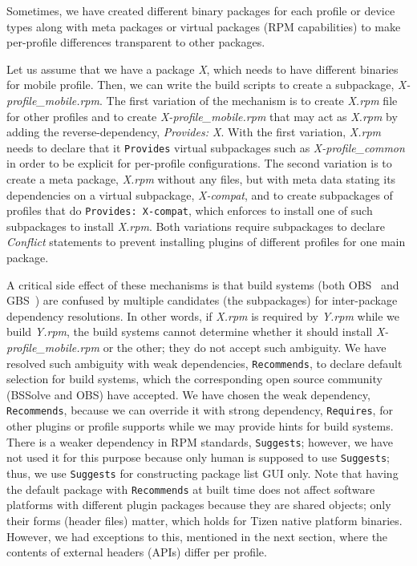 Sometimes, we have created different binary packages for each profile or device types along with meta packages or virtual packages (RPM capabilities) to make per-profile differences transparent to other packages.


Let us assume that we have a package \textit{X}, which needs to have different binaries for mobile profile.
Then, we can write the build scripts to create a subpackage, \textit{X-profile\_mobile.rpm}.
The first variation of the mechanism is to create \textit{X.rpm} file for other profiles and to create \textit{X-profile\_mobile.rpm} that may act as \textit{X.rpm} by adding the reverse-dependency, \textit{Provides: X}.
With the first variation, \textit{X.rpm} needs to declare that it \texttt{Provides} virtual subpackages such as \textit{X-profile\_common} in order to be explicit for per-profile configurations.
The second variation is to create a meta package, \textit{X.rpm} without any files, but with meta data stating its dependencies on a virtual subpackage, \textit{X-compat}, and to create subpackages of profiles that do \texttt{Provides: X-compat}, which enforces to install one of such subpackages to install \textit{X.rpm}.
Both variations require subpackages to declare \textit{Conflict} statements to prevent installing plugins of different profiles for one main package.


A critical side effect of these mechanisms is that build systems (both OBS~\cite{19OBS_URL} and GBS~\cite{2Ham2017TDC}) are confused by multiple candidates (the subpackages) for inter-package dependency resolutions.
In other words, if \textit{X.rpm} is required by \textit{Y.rpm} while we build \textit{Y.rpm}, the build systems cannot determine whether it should install \textit{X-profile\_mobile.rpm} or the other; they do not accept such ambiguity.
We have resolved such ambiguity with weak dependencies, \texttt{Recommends}, to declare default selection for build systems, which the corresponding open source community (BSSolve and OBS) have accepted.
We have chosen the weak dependency, \texttt{Recommends}, because we can override it with strong dependency, \texttt{Requires}, for other plugins or profile supports while we may provide hints for build systems.
There is a weaker dependency in RPM standards, \texttt{Suggests}; however, we have not used it for this purpose because only human is supposed to use \texttt{Suggests}; thus, we use \texttt{Suggests} for constructing package list GUI only.
Note that having the default package with \texttt{Recommends} at built time does not affect software platforms with different plugin packages because they are shared objects; only their forms (header files) matter, which holds for Tizen native platform binaries.
However, we had exceptions to this, mentioned in the next section, where the contents of external headers (APIs) differ per profile.



